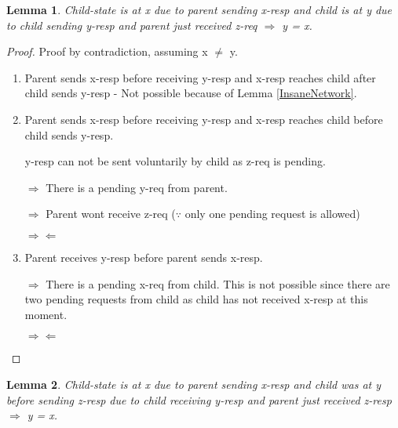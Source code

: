 \documentclass{article}
\newtheorem{lemma}{Lemma}
\begin{document}
\begin{lemma}
Child-state is at x due to parent sending x-resp and child is at y due to child sending y-resp and parent just received z-req $\Rightarrow$ y = x.
\label{CSendPSendReq}
\end{lemma}

\begin{proof}

Proof by contradiction, assuming x $\neq$ y.

\begin{enumerate}
\item Parent sends x-resp before receiving y-resp and x-resp reaches child after child sends y-resp - Not possible because of Lemma \ref{InsaneNetwork}.
\item Parent sends x-resp before receiving y-resp and x-resp reaches child before child sends y-resp.

\begin{figure}
\centering
\end{figure}

y-resp can not be sent voluntarily by child as z-req is pending.

$\Rightarrow$ There is a pending y-req from parent.

$\Rightarrow$ Parent wont receive z-req ($\because$ only one pending request is allowed)

$\Rightarrow \Leftarrow$

\item Parent receives y-resp before parent sends x-resp.

\begin{figure}
\centering
\end{figure}

$\Rightarrow$ There is a pending x-req from child. This is not possible since there are two pending requests from child as child has not received x-resp at this moment.

$\Rightarrow \Leftarrow$

\end{enumerate}

\end{proof}

\begin{lemma}
Child-state is at x due to parent sending x-resp and child was at y before sending z-resp due to child receiving y-resp and parent just received z-resp $\Rightarrow$ y = x.
\label{CRecvPSendResp}
\end{lemma}
\end{document}
